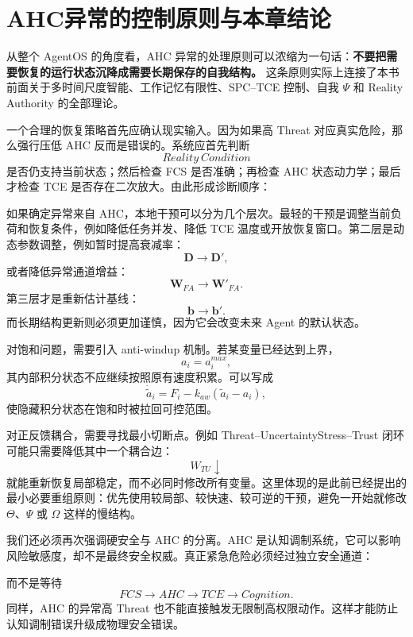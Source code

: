 \section{AHC异常的控制原则与本章结论}
\label{sec:ahc_pathology_conclusion}

从整个 AgentOS 的角度看，AHC 异常的处理原则可以浓缩为一句话：\textbf{不要把需要恢复的运行状态沉降成需要长期保存的自我结构。} 这条原则实际上连接了本书前面关于多时间尺度智能、工作记忆有限性、SPC--TCE 控制、自我 $\Psi$ 和 Reality Authority 的全部理论。

一个合理的恢复策略首先应确认现实输入。因为如果高 Threat 对应真实危险，那么强行压低 AHC 反而是错误的。系统应首先判断
\[
Reality\ Condition
\]
是否仍支持当前状态；然后检查 FCS 是否准确；再检查 AHC 状态动力学；最后才检查 TCE 是否存在二次放大。由此形成诊断顺序：
\begin{statementbox}
\centering
{}
\end{statementbox}

如果确定异常来自 AHC，本地干预可以分为几个层次。最轻的干预是调整当前负荷和恢复条件，例如降低任务并发、降低 TCE 温度或开放恢复窗口。第二层是动态参数调整，例如暂时提高衰减率：
\[
\mathbf D
\rightarrow
\mathbf D',
\]
或者降低异常通道增益：
\[
\mathbf W_{FA}
\rightarrow
\mathbf W'_{FA}.
\]
第三层才是重新估计基线：
\[
\mathbf b\rightarrow\mathbf b'.
\]
而长期结构更新则必须更加谨慎，因为它会改变未来 Agent 的默认状态。

对饱和问题，需要引入 anti-windup 机制。若某变量已经达到上界，
\[
a_i=a_i^{max},
\]
其内部积分状态不应继续按照原有速度积累。可以写成
\[
\dot{\tilde a}_i
=
F_i
-
k_{aw}
\left(
\tilde a_i-a_i
\right),
\]
使隐藏积分状态在饱和时被拉回可控范围。

对正反馈耦合，需要寻找最小切断点。例如 Threat--UncertaintyStress--Trust 闭环可能只需要降低其中一个耦合边：
\[
W_{TU}\downarrow
\]
就能重新恢复局部稳定，而不必同时修改所有变量。这里体现的是此前已经提出的最小必要重组原则：优先使用较局部、较快速、较可逆的干预，避免一开始就修改 $\Theta$、$\Psi$ 或 $\Omega$ 这样的慢结构。

我们还必须再次强调硬安全与 AHC 的分离。AHC 是认知调制系统，它可以影响风险敏感度，却不是最终安全权威。真正紧急危险必须经过独立安全通道：
\begin{statementbox}
\centering
{}
\end{statementbox}
而不是等待
\[
FCS\rightarrow AHC\rightarrow TCE\rightarrow Cognition.
\]
同样，AHC 的异常高 Threat 也不能直接触发无限制高权限动作。这样才能防止认知调制错误升级成物理安全错误。

